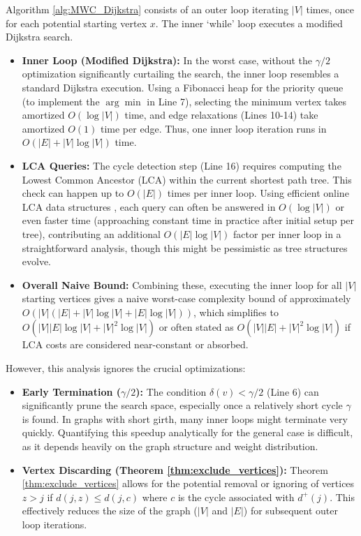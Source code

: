 \documentclass{article}
\begin{document}
Algorithm \ref{alg:MWC_Dijkstra} consists of an outer loop iterating $|V|$ times, once for each potential starting vertex $x$. The inner `while' loop executes a modified Dijkstra search.
\begin{itemize}
    \item \textbf{Inner Loop (Modified Dijkstra):} In the worst case, without the $\gamma/2$ optimization significantly curtailing the search, the inner loop resembles a standard Dijkstra execution. Using a Fibonacci heap for the priority queue (to implement the $\arg\min$ in Line 7), selecting the minimum vertex takes amortized $O(\log |V|)$ time, and edge relaxations (Lines 10-14) take amortized $O(1)$ time per edge. Thus, one inner loop iteration runs in $O(|E| + |V|\log |V|)$ time.
    \item \textbf{LCA Queries:} The cycle detection step (Line 16) requires computing the Lowest Common Ancestor (LCA) within the current shortest path tree. This check can happen up to $O(|E|)$ times per inner loop. Using efficient online LCA data structures \cite{OnlineLCA}, each query can often be answered in $O(\log |V|)$ or even faster time (approaching constant time in practice after initial setup per tree), contributing an additional $O(|E| \log |V|)$ factor per inner loop in a straightforward analysis, though this might be pessimistic as tree structures evolve.
    \item \textbf{Overall Naive Bound:} Combining these, executing the inner loop for all $|V|$ starting vertices gives a naive worst-case complexity bound of approximately $O(|V|(|E| + |V|\log |V| + |E|\log |V|))$, which simplifies to $O(|V||E|\log|V| + |V|^2\log |V|)$ or often stated as $O(|V||E| + |V|^2\log |V|)$ if LCA costs are considered near-constant or absorbed.
\end{itemize}


However, this analysis ignores the crucial optimizations:
\begin{itemize}
    \item \textbf{Early Termination ($\gamma/2$):} The condition $\delta(v) < \gamma/2$ (Line 6) can significantly prune the search space, especially once a relatively short cycle $\gamma$ is found. In graphs with short girth, many inner loops might terminate very quickly. Quantifying this speedup analytically for the general case is difficult, as it depends heavily on the graph structure and weight distribution.
    \item \textbf{Vertex Discarding (Theorem \ref{thm:exclude_vertices}):} Theorem \ref{thm:exclude_vertices} allows for the potential removal or ignoring of vertices $z > j$ if $d(j,z) \le d(j,c)$ where $c$ is the cycle associated with $d^+(j)$. This effectively reduces the size of the graph ($|V|$ and $|E|$) for subsequent outer loop iterations.
\end{itemize}
\end{document}
